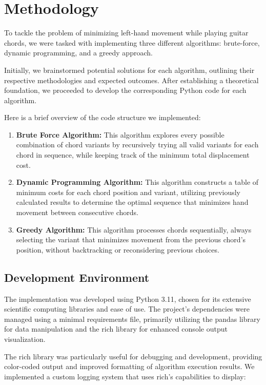 \documentclass[lettersize,journal]{IEEEtran}
\begin{document}
\section{Methodology}
To tackle the problem of minimizing left-hand movement while playing guitar chords, we were tasked with implementing three different algorithms: brute-force, dynamic programming, and a greedy approach. 

Initially, we brainstormed potential solutions for each algorithm, outlining their respective methodologies and expected outcomes. After establishing a theoretical foundation, we proceeded to develop the corresponding Python code for each algorithm.

Here is a brief overview of the code structure we implemented:
\begin{enumerate}
    \item \textbf{Brute Force Algorithm:} This algorithm explores every possible combination of chord variants by recursively trying all valid variants for each chord in sequence, while keeping track of the minimum total displacement cost.

    \item \textbf{Dynamic Programming Algorithm:} This algorithm constructs a table of minimum costs for each chord position and variant, utilizing previously calculated results to determine the optimal sequence that minimizes hand movement between consecutive chords.

    \item \textbf{Greedy Algorithm:} This algorithm processes chords sequentially, always selecting the variant that minimizes movement from the previous chord's position, without backtracking or reconsidering previous choices.
\end{enumerate}

\subsection{Development Environment}
The implementation was developed using Python 3.11, chosen for its extensive scientific computing libraries and ease of use. The project's dependencies were managed using a minimal requirements file, primarily utilizing the pandas library for data manipulation and the rich library for enhanced console output visualization.

The rich library was particularly useful for debugging and development, providing color-coded output and improved formatting of algorithm execution results. We implemented a custom logging system that uses rich's capabilities to display:
\end{document}
